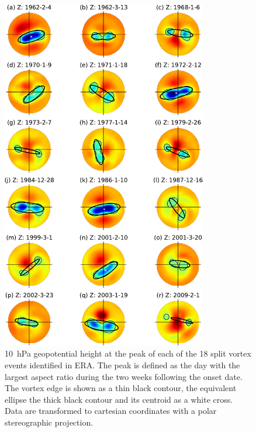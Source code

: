\begin{figure}[htbp]
 \centering
 \noindent\includegraphics[width=0.8\textwidth]{figures/chapter-moments/GPH_all_events_splits.pdf}
 \caption[Geopotential height at the peak of split vortex events.]{10~hPa
   geopotential height at the peak of each of the 18 split vortex events
   identified in ERA. The peak is defined as the day with the largest aspect
   ratio during the two weeks following the onset date. The vortex edge is shown
   as a thin black contour, the equivalent ellipse the thick black contour and
   its centroid as a white cross. Data are transformed to cartesian coordinates
   with a polar stereographic projection.}
 \label{fig:gph_all_events_splits}
\end{figure}

